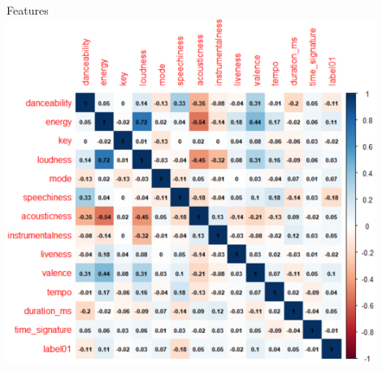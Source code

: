 \documentclass[landscape,a0paper,fontscale=0.34]{baposter}
\begin{document}
\begin{poster}
\begin{posterbox}[name=features,column=0,row=0,span=1,below = intro]{Features}
\centering
\includegraphics[width=0.9\textwidth]{corrplot2.PNG}
\end{posterbox}




\end{poster}
\end{document}
